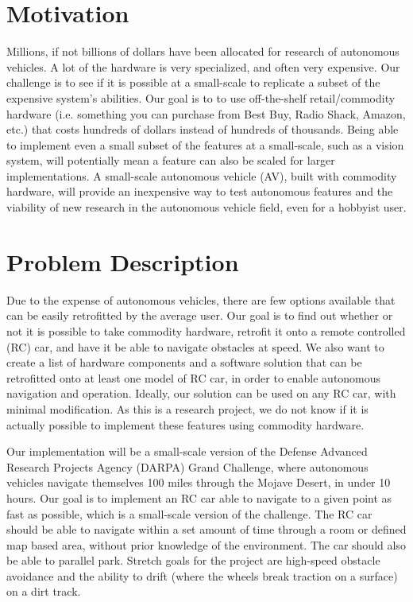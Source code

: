 \documentclass[draftclsnofoot,onecolumn,10pt]{IEEEtran}
\begin{document}
\section{Motivation}
Millions, if not billions of dollars have been allocated for research of autonomous vehicles. 
A lot of the hardware is very specialized, and often very expensive. 
Our challenge is to see if it is possible  at a small-scale to replicate a subset of the expensive system's abilities.
Our goal is to to use off-the-shelf retail/commodity hardware (i.e. something you can purchase from Best Buy, Radio Shack, Amazon, etc.) that costs hundreds of dollars instead of hundreds of thousands. 
Being able to implement even a small subset of the features at a small-scale, such as a vision system, will potentially mean a feature can also be scaled for larger implementations. 
A small-scale autonomous vehicle (AV), built with commodity hardware, will provide an inexpensive way to test autonomous features and the viability of new research in the autonomous vehicle field, even for a hobbyist user.

\section{Problem Description}
Due to the expense of autonomous vehicles, there are few options available that can be easily retrofitted by the average user. 
Our goal is to find out whether or not it is possible to take commodity hardware, retrofit it onto a remote controlled (RC) car, and have it be able to navigate obstacles at speed. 
We also want to create a list of hardware components and a software solution that can be retrofitted onto at least one model of RC car, in order to enable autonomous navigation and operation. 
Ideally,  our solution can be used on any RC car, with minimal modification. 
As this is a research project, we do not know if it is actually possible to implement these features using commodity hardware.\par
Our implementation will be a small-scale version of the Defense Advanced Research Projects Agency (DARPA) Grand Challenge, where autonomous vehicles navigate themselves 100 miles through the Mojave Desert, in under 10 hours. 
Our goal is to implement an RC car able to navigate to a given point as fast as possible, which is a small-scale version of the challenge. 
The RC car should be able to navigate within a set amount of time through a room or defined map based area, without prior knowledge of the environment.
The car should also be able to parallel park. 
Stretch goals for the project are high-speed obstacle avoidance and the ability to drift (where the wheels break traction on a surface) on a dirt track.
\end{document}
